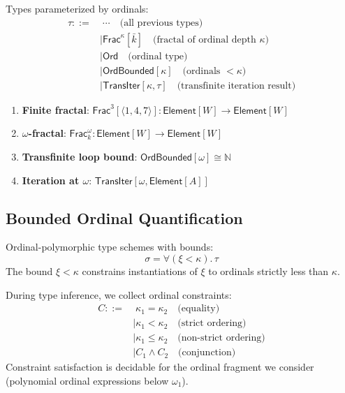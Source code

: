 \begin{definition}
\label{def:ordinal-indexed-types-def}
Types parameterized by ordinals:
\begin{align}
\tau ::=&\; \cdots \quad \text{(all previous types)} \\
    &\mid \mathsf{Frac}^\kappa[\bar{k}] \quad \text{(fractal of ordinal depth } \kappa \text{)} \\
    &\mid \mathsf{Ord} \quad \text{(ordinal type)} \\
    &\mid \mathsf{OrdBounded}[\kappa] \quad \text{(ordinals } < \kappa \text{)} \\
    &\mid \mathsf{TransIter}[\kappa, \tau] \quad \text{(transfinite iteration result)}
\end{align}
\end{definition}

\begin{example}
\label{ex:ordinal-types}
\begin{enumerate}
  \item \textbf{Finite fractal}: $\mathsf{Frac}^3[\langle 1,4,7 \rangle] : \mathsf{Element}[W] \to \mathsf{Element}[W]$
  \item \textbf{$\omega$-fractal}: $\mathsf{Frac}^\omega_k : \mathsf{Element}[W] \to \mathsf{Element}[W]$
  \item \textbf{Transfinite loop bound}: $\mathsf{OrdBounded}[\omega] \cong \mathbb{N}$
  \item \textbf{Iteration at $\omega$}: $\mathsf{TransIter}[\omega, \mathsf{Element}[A]]$
\end{enumerate}
\end{example}

\subsection{Bounded Ordinal Quantification}
\label{subsec:bounded-ordinal}

\begin{definition}
\label{def:ordinal-bounded-quant}
Ordinal-polymorphic type schemes with bounds:
\[
\sigma = \forall (\xi < \kappa).\, \tau
\]
The bound $\xi < \kappa$ constrains instantiations of $\xi$ to ordinals strictly less than $\kappa$.
\end{definition}

\begin{definition}
\label{def:ordinal-constraints}
During type inference, we collect ordinal constraints:
\begin{align}
C ::=&\; \kappa_1 = \kappa_2 \quad \text{(equality)} \\
    &\mid \kappa_1 < \kappa_2 \quad \text{(strict ordering)} \\
    &\mid \kappa_1 \leq \kappa_2 \quad \text{(non-strict ordering)} \\
    &\mid C_1 \land C_2 \quad \text{(conjunction)}
\end{align}
Constraint satisfaction is decidable for the ordinal fragment we consider (polynomial ordinal expressions below $\omega_1$).
\end{definition}

